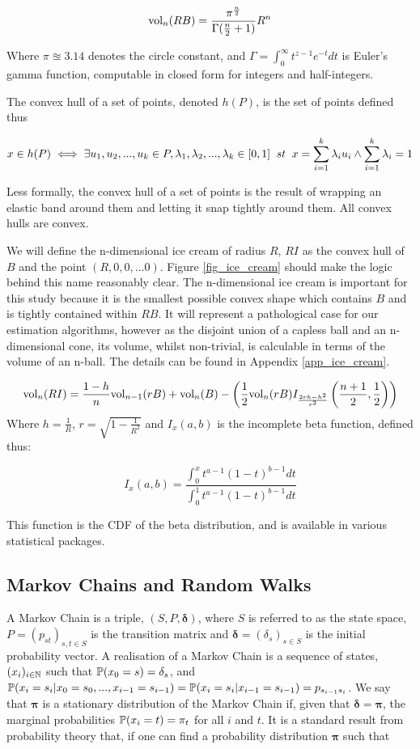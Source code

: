 $$
\mbox{vol}_n(RB) = \frac{\pi^{\frac{n}{2}}}{\Gamma(\frac{n}{2}+1)}R^n
$$

Where $\pi \approxeq 3.14$ denotes the circle constant, and $\Gamma = \int^\infty_0 t^{z-1}e^{-t} dt$ is Euler's gamma function, computable in closed form for integers and half-integers.

The convex hull of a set of points, denoted $h(P)$, is the set of points defined thus

$$
x \in h(P) \iff \exists u_1, u_2,...,u_k \in P, \lambda_1, \lambda_2, ..., \lambda_k  \in [0,1] \;\; st \;\; x = \sum^{k}_{i=1} \lambda_i u_i \wedge \sum^{k}_{i=1} \lambda_i = 1
$$

Less formally, the convex hull of a set of points is the result of wrapping an elastic band around them and letting it snap tightly around them. All convex hulls are convex.

We will define the n-dimensional ice cream of radius $R$, $RI$ as the convex hull of $B$ and the point $(R,0,0,...0)$. Figure \ref{fig_ice_cream} should make the logic behind this name reasonably clear. The n-dimensional ice cream is important for this study because it is the smallest possible convex shape which contains $B$ and is tightly contained within $RB$. It will represent a pathological case for our estimation algorithms, however as the disjoint union of a capless ball and an n-dimensional cone, its volume, whilst non-trivial, is calculable in terms of the volume of an n-ball. The details can be found in Appendix \ref{app_ice_cream}.

$$
\vol_n(RI) = \frac{1-h}{n} \vol_{n-1}(rB) + \vol_n(B) - \left(\frac{1}{2}\vol_n(rB) I_{\frac{2rh-h^2}{r^2}}\left(\frac{n+1}{2}, \frac{1}{2}\right)\right) %
$$
Where $h = \frac{1}{R}$, $r = \sqrt{1-\frac{1}{R^2}}$ and $I_x(a,b)$ is the incomplete beta function, defined thus:

$$
I_x(a,b) = \frac{\int^x_0 t^{a-1}(1-t)^{b-1}dt}{\int^1_0 t^{a-1}(1-t)^{b-1} dt}
$$

This function is the CDF of the beta distribution, and is available in various statistical packages.

\subsection{Markov Chains and Random Walks}

A Markov Chain is a triple, $(S,P,\bm{\delta})$, where $S$ is referred to as the state space, $P = (p_{st})_{s,t \in S}$ is the transition matrix and $\bm{\delta} = (\delta_s)_{s \in S}$ is the initial probability vector. A realisation of a Markov Chain is a sequence of states, $(x_i)_{i \in \mathbb{N}}$ such that $\mathbb{P} (x_0 = s)=\delta_s$, and $\mathbb{P}(x_i = s_i | x_0 = s_0, ..., x_{i-1} = s_{i-1}) = \mathbb{P} (x_i = s_i | x_{i-1} = s_{i-1})= p_{s_{i-1}s_{i}}$. We say that $\bm{\pi}$ is a stationary distribution of the Markov Chain if, given that $\bm{\delta} = \bm{\pi}$, the marginal probabilities $\mathbb{P}(x_i = t) = \pi_t$ for all $i$ and $t$.  It is a standard result from probability theory that, if one can find a probability distribution $\bm{\pi}$ such that

